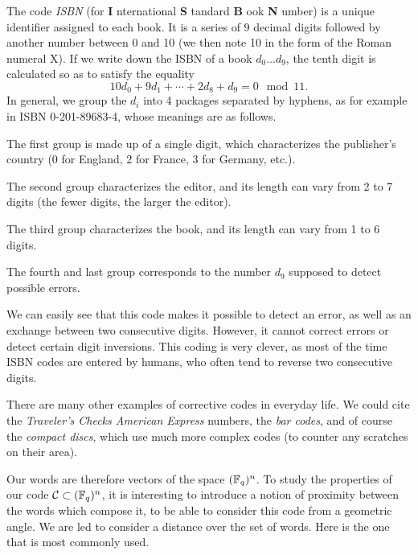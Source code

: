  
\begin{exmp}
 The code \textit{ISBN} (for \textbf{I} nternational \textbf{S} tandard \textbf{B} ook \textbf{N} umber) is a unique identifier assigned to each book. It is a series of 9 decimal digits followed by another number between 0 and 10 (we then note 10 in the form of the Roman numeral X). If we write down the ISBN of a book $ d_0 \ldots d_9 $, the tenth digit is calculated so as to satisfy the equality
\begin{equation*}
10 d_0 + 9 d_1 + \cdots + 2 d_8 + d_9 = 0 \mod{11}.
\end{equation*}
In general, we group the $ d_i $ into 4 packages separated by hyphens, as for example in ISBN 0-201-89683-4, whose meanings are as follows. \begin{rs}
\item The first group is made up of a single digit, which characterizes the publisher's country (0 for England, 2 for France, 3 for Germany, etc.).
\item The second group characterizes the editor, and its length can vary from 2 to 7 digits (the fewer digits, the larger the editor).
\item The third group characterizes the book, and its length can vary from 1 to 6 digits.
\item The fourth and last group corresponds to the number $ d_9 $ supposed to detect possible errors.
\end{rs} We can easily see that this code makes it possible to detect an error, as well as an exchange between two consecutive digits. However, it cannot correct errors or detect certain digit inversions. This coding is very clever, as most of the time ISBN codes are entered by humans, who often tend to reverse two consecutive digits.
\end{exmp}
There are many other examples of corrective codes in everyday life. We could cite the \textit{Traveler's Checks American Express} numbers, the \textit{bar codes}, and of course the \textit{compact discs}, which use much more complex codes (to counter any scratches on their area).
 
 
Our words are therefore vectors of the space $ (\mathbb{F}_q)^n $. To study the properties of our code $ \mathcal{C} \subset (\mathbb{F}_q)^n $, it is interesting to introduce a notion of proximity between the words which compose it, to be able to consider this code from a geometric angle. We are led to consider a distance over the set of words. Here is the one that is most commonly used.
 
